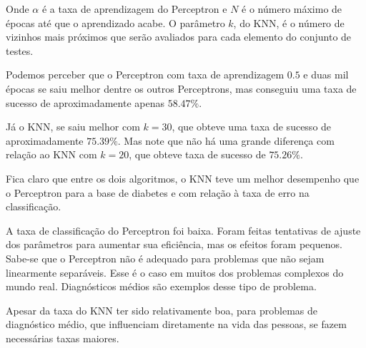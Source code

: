 \documentclass{article}
\begin{document}
Onde $\alpha$ é a taxa de aprendizagem do Perceptron e $N$ é o número máximo de 
épocas até que o aprendizado acabe. O parâmetro $k$, do KNN, é o número de 
vizinhos mais próximos que serão avaliados para cada elemento do conjunto de 
testes.

Podemos perceber que o Perceptron com taxa de aprendizagem $0.5$ e duas mil 
épocas se saiu melhor dentre os outros Perceptrons, mas conseguiu uma taxa de 
sucesso de aproximadamente apenas $58.47\%$.

Já o KNN, se saiu melhor com $k = 30$, que obteve uma taxa de sucesso de 
aproximadamente $75.39\%$. Mas note que não há uma grande diferença com 
relação ao KNN com $k = 20$, que obteve taxa de sucesso de $75.26\%$.

Fica claro que entre os dois algoritmos, o KNN teve um melhor desempenho que 
o Perceptron para a base de diabetes e com relação à taxa de erro na 
classificação.

A taxa de classificação do Perceptron foi baixa. Foram feitas tentativas de 
ajuste dos parâmetros para aumentar sua eficiência, mas os efeitos foram 
pequenos. Sabe-se que o Perceptron não é adequado para problemas que não sejam 
linearmente separáveis. Esse é o caso em muitos dos problemas complexos do 
mundo real. Diagnósticos médios são exemplos desse tipo de problema.

Apesar da taxa do KNN ter sido relativamente boa, para problemas de diagnóstico 
médio, que influenciam diretamente na vida das pessoas, se fazem 
necessárias taxas maiores.
	


\end{document}
